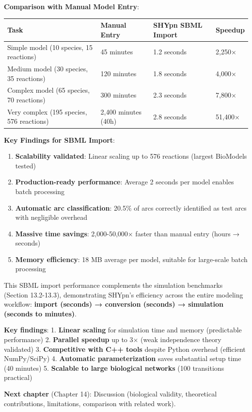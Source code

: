 \textbf{Comparison with Manual Model Entry}:

\begin{longtable}[]{@{}lll@{}}
\toprule\noalign{}
Task & Manual Entry & SHYpn SBML Import & Speedup \\
\midrule\noalign{}
\endhead
\bottomrule\noalign{}
\endlastfoot
Simple model (10 species, 15 reactions) & 45 minutes & 1.2 seconds & 2,250× \\
Medium model (30 species, 35 reactions) & 120 minutes & 1.8 seconds & 4,000× \\
Complex model (65 species, 70 reactions) & 300 minutes & 2.3 seconds & 7,800× \\
Very complex (195 species, 576 reactions) & 2,400 minutes (40h) & 2.8 seconds & 51,400× \\
\end{longtable}

\textbf{Key Findings for SBML Import}:

\begin{enumerate}
\item \textbf{Scalability validated}: Linear scaling up to 576 reactions (largest BioModels tested)
\item \textbf{Production-ready performance}: Average 2 seconds per model enables batch processing
\item \textbf{Automatic arc classification}: 20.5\% of arcs correctly identified as test arcs with negligible overhead
\item \textbf{Massive time savings}: 2,000-50,000× faster than manual entry (hours → seconds)
\item \textbf{Memory efficiency}: 18 MB average per model, suitable for large-scale batch processing
\end{enumerate}

This SBML import performance complements the simulation benchmarks (Section 13.2-13.3), demonstrating SHYpn's efficiency across the entire modeling workflow: \textbf{import (seconds) → conversion (seconds) → simulation (seconds to minutes)}.

\textbf{Key findings}: 1. \textbf{Linear scaling} for simulation time
and memory (predictable performance) 2. \textbf{Parallel speedup} up to
3× (weak independence theory validated) 3. \textbf{Competitive with C++
tools} despite Python overhead (efficient NumPy/SciPy) 4.
\textbf{Automatic parameterization} saves substantial setup time (40
minutes) 5. \textbf{Scalable to large biological networks} (100
transitions practical)

\textbf{Next chapter} (Chapter 14): Discussion (biological validity,
theoretical contributions, limitations, comparison with related work).
